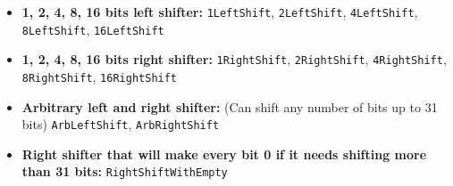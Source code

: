 \documentclass{article}
\begin{document}
\begin{itemize}
    \item \textbf{1, 2, 4, 8, 16 bits left shifter:} \texttt{1LeftShift}, \texttt{2LeftShift}, \texttt{4LeftShift}, \texttt{8LeftShift}, \texttt{16LeftShift}
    \item \textbf{1, 2, 4, 8, 16 bits right shifter:} \texttt{1RightShift}, \texttt{2RightShift}, \texttt{4RightShift}, \texttt{8RightShift}, \texttt{16RightShift}
    \item \textbf{Arbitrary left and right shifter:} (Can shift any number of bits up to 31 bits) \texttt{ArbLeftShift}, \texttt{ArbRightShift}
    \item \textbf{Right shifter that will make every bit 0 if it needs shifting more than 31 bits:} \texttt{RightShiftWithEmpty}
\end{itemize}
\end{document}
